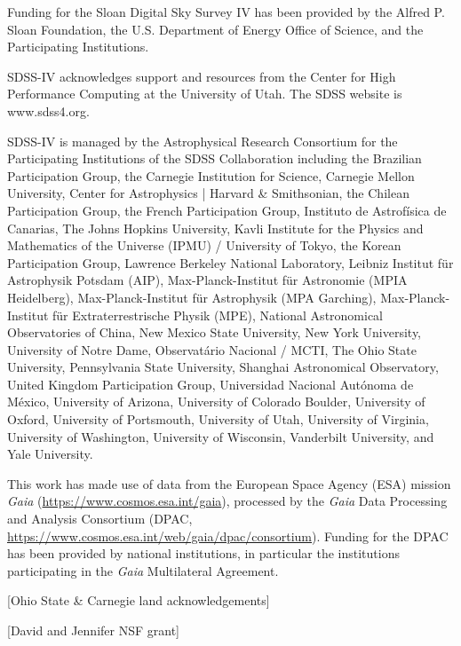 \documentclass[modern,linenumbers]{aastex631}
\begin{document}
\begin{acknowledgments}
    
    Funding for the Sloan Digital Sky 
    Survey IV has been provided by the 
    Alfred P. Sloan Foundation, the U.S. 
    Department of Energy Office of 
    Science, and the Participating 
    Institutions. 
    
    SDSS-IV acknowledges support and 
    resources from the Center for High 
    Performance Computing  at the 
    University of Utah. The SDSS 
    website is www.sdss4.org.
    
    SDSS-IV is managed by the 
    Astrophysical Research Consortium 
    for the Participating Institutions 
    of the SDSS Collaboration including 
    the Brazilian Participation Group, 
    the Carnegie Institution for Science, 
    Carnegie Mellon University, Center for 
    Astrophysics | Harvard \& 
    Smithsonian, the Chilean Participation 
    Group, the French Participation Group, 
    Instituto de Astrof\'isica de 
    Canarias, The Johns Hopkins 
    University, Kavli Institute for the 
    Physics and Mathematics of the 
    Universe (IPMU) / University of 
    Tokyo, the Korean Participation Group, 
    Lawrence Berkeley National Laboratory, 
    Leibniz Institut f\"ur Astrophysik 
    Potsdam (AIP),  Max-Planck-Institut 
    f\"ur Astronomie (MPIA Heidelberg), 
    Max-Planck-Institut f\"ur 
    Astrophysik (MPA Garching), 
    Max-Planck-Institut f\"ur 
    Extraterrestrische Physik (MPE), 
    National Astronomical Observatories of 
    China, New Mexico State University, 
    New York University, University of 
    Notre Dame, Observat\'ario 
    Nacional / MCTI, The Ohio State 
    University, Pennsylvania State 
    University, Shanghai 
    Astronomical Observatory, United 
    Kingdom Participation Group, 
    Universidad Nacional Aut\'onoma 
    de M\'exico, University of Arizona, 
    University of Colorado Boulder, 
    University of Oxford, University of 
    Portsmouth, University of Utah, 
    University of Virginia, University 
    of Washington, University of 
    Wisconsin, Vanderbilt University, 
    and Yale University.
    
    This work has made use of data from the European Space Agency (ESA) mission
    {\it Gaia} (\url{https://www.cosmos.esa.int/gaia}), processed by the {\it Gaia}
    Data Processing and Analysis Consortium (DPAC,
    \url{https://www.cosmos.esa.int/web/gaia/dpac/consortium}). Funding for the DPAC
    has been provided by national institutions, in particular the institutions
    participating in the {\it Gaia} Multilateral Agreement.

    [Ohio State \& Carnegie land acknowledgements]

    [David and Jennifer NSF grant]

\end{acknowledgments}
\end{document}
